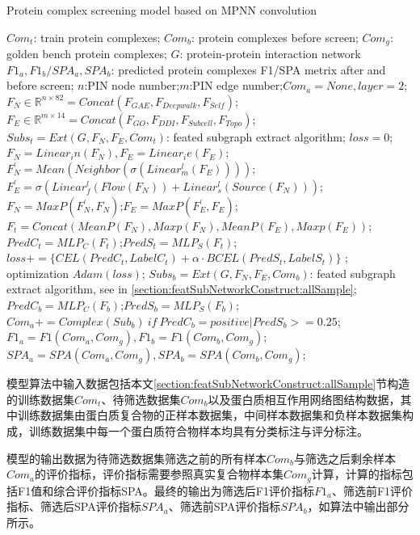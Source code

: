 \begin{algorithm}[h]
    \caption{Protein complex screening model based on MPNN convolution} %
    \label{alg:mpnngcn-screen}
    \begin{algorithmic}[1]
        \Require
        $Com_t$: train protein complexes;
        $Com_b$: protein complexes before screen;
        $Com_g$: golden bench protein complexes;
        $G$: protein-protein interaction network
        \Ensure
        $F1_a,F1_b/SPA_a,SPA_b$: predicted protein complexes F1/SPA metrix after and before screen;
        \State $n$:PIN node number;$m$:PIN edge number;$Com_a=None,layer=2$;
        \State $F_{N} \in \mathbb{R}^{n\times 82}=Concat(F_{GAE},F_{Deepwalk},F_{Self})$;
        \State $F_{E} \in \mathbb{R}^{m\times 14}=Concat(F_{GO},F_{DDI},F_{Subcell},F_{Topo})$;
        \State $Subs_t=Ext(G,F_{N},F_{E},Com_t)$: feated subgraph extract algorithm;
         $loss=0$;
         ~$F_{N}=Linear_in(F_{N}),F_{E}=Linear_ie(F_{E})$;
        \State $F_{N}^\prime =Mean(Neighbor(\sigma (Linear_m^l(F_{E}))))$;
        \State $F_{E}^\prime =\sigma (Linear_f^l(Flow(F_{N}))+Linear_s^l(Source(F_{N})))$;
        \State $F_{N} =MaxP(F_{N}^\prime,F_{N})$;$F_{E}=MaxP(F_{E}^\prime,F_{E})$;
        \EndFor
        \State $F_t=Concat(MeanP(F_{N}),Maxp(F_{N}),MeanP(F_{E}),Maxp(F_{E}))$;
        \State $PredC_t=MLP_C(F_t)$;$PredS_t=MLP_S(F_t)$;
        \State $loss+=\{CEL(PredC_t,LabelC_t)+\alpha \cdot BCEL(PredS_t,LabelS_t)\}$
        \EndFor; optimization $Adam(loss)$;
        \EndFor
        \EndFor
        \State $Subs_b=Ext(G,F_{N},F_{E},Com_b)$: feated subgraph extract algorithm, see in \ref{section:featSubNetworkConstruct:allSample};
         $PredC_b=MLP_C(F_b)$;$PredS_b=MLP_S(F_b)$;
        \State $Com_a+=Complex(Sub_b)~if~PredC_b=positive|PredS_b>=0.25$;
        \EndFor
        \State $F1_a=F1(Com_a,Com_g),F1_b=F1(Com_b,Com_g)$;
        \State $SPA_a=SPA(Com_a,Com_g),SPA_b=SPA(Com_b,Com_g)$;
    \end{algorithmic}
\end{algorithm}
模型算法中输入数据包括本文\ref{section:featSubNetworkConstruct:allSample}节构造的训练数据集$Com_t$、待筛选数据集$Com_b$以及蛋白质相互作用网络图结构数据，其中训练数据集由蛋白质复合物的正样本数据集，中间样本数据集和负样本数据集构成，训练数据集中每一个蛋白质符合物样本均具有分类标注与评分标注。

模型的输出数据为待筛选数据集筛选之前的所有样本$Com_b$与筛选之后剩余样本$Com_a$的评价指标，评价指标需要参照真实复合物样本集$Com_g$计算，计算的指标包括F1值和综合评价指标SPA。最终的输出为筛选后F1评价指标$F1_a$、筛选前F1评价指标、筛选后SPA评价指标$SPA_a$、筛选前SPA评价指标$SPA_b$，如算法中输出部分所示。

